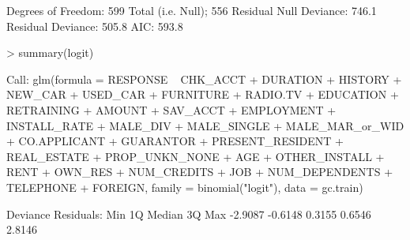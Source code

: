 \documentclass{article}
\begin{document}
\begin{Schunk}
\begin{Soutput}
Degrees of Freedom: 599 Total (i.e. Null);  556 Residual
Null Deviance:	    746.1 
Residual Deviance: 505.8 	AIC: 593.8
\end{Soutput}
\begin{Sinput}
> summary(logit)
\end{Sinput}
\begin{Soutput}
Call:
glm(formula = RESPONSE ~ CHK_ACCT + DURATION + HISTORY + NEW_CAR + 
    USED_CAR + FURNITURE + RADIO.TV + EDUCATION + RETRAINING + 
    AMOUNT + SAV_ACCT + EMPLOYMENT + INSTALL_RATE + MALE_DIV + 
    MALE_SINGLE + MALE_MAR_or_WID + CO.APPLICANT + GUARANTOR + 
    PRESENT_RESIDENT + REAL_ESTATE + PROP_UNKN_NONE + AGE + OTHER_INSTALL + 
    RENT + OWN_RES + NUM_CREDITS + JOB + NUM_DEPENDENTS + TELEPHONE + 
    FOREIGN, family = binomial("logit"), data = gc.train)

Deviance Residuals: 
    Min       1Q   Median       3Q      Max  
-2.9087  -0.6148   0.3155   0.6546   2.8146  


\end{Soutput}
\end{Schunk}
\end{document}
